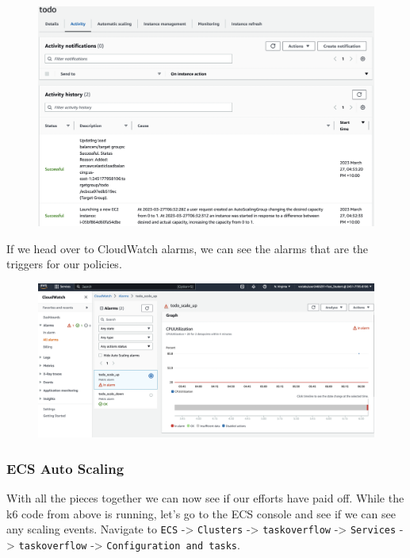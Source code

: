 \documentclass{csse4400}
\begin{document}
\begin{figure}[H]
  \begin{center}
    \includegraphics[width=\textwidth]{images/ec2_6}
  \end{center}
\end{figure}

If we head over to CloudWatch alarms, we can see the alarms that are the triggers for our policies.

\begin{figure}[H]
  \begin{center}
    \includegraphics[width=\textwidth]{images/ec2_7}
  \end{center}
\end{figure}

\subsubsection{ECS Auto Scaling}

With all the pieces together we can now see if our efforts have paid off.
While the k6 code from above is running, let's go to the ECS console and see if we can see any scaling events.
Navigate to \texttt{ECS} -> \texttt{Clusters} -> \texttt{taskoverflow} -> \texttt{Services} -> \texttt{taskoverflow} -> \texttt{Configuration and tasks}.
\end{document}
